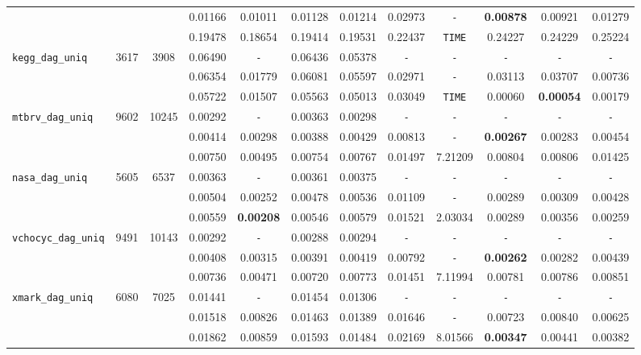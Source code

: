 \begin{table}
{\begin{tabular}{ l c c | c c c c c c c c c }
 &  &  & 0.01166 & 0.01011 & 0.01128 & 0.01214 & 0.02973 & \verb|-| & \textbf{0.00878} & 0.00921 & 0.01279 \\
 &  &  & 0.19478 & 0.18654 & 0.19414 & 0.19531 & 0.22437 & \verb|TIME| & 0.24227 & 0.24229 & 0.25224 \\
\hline
\verb|kegg_dag_uniq| & 3617 & 3908 & 0.06490 & \verb|-| & 0.06436 & 0.05378 & \verb|-| & \verb|-| & \verb|-| & \verb|-| & \verb|-| \\
 &  &  & 0.06354 & 0.01779 & 0.06081 & 0.05597 & 0.02971 & \verb|-| & 0.03113 & 0.03707 & 0.00736 \\
 &  &  & 0.05722 & 0.01507 & 0.05563 & 0.05013 & 0.03049 & \verb|TIME| & 0.00060 & \textbf{0.00054} & 0.00179 \\
\hline
\verb|mtbrv_dag_uniq| & 9602 & 10245 & 0.00292 & \verb|-| & 0.00363 & 0.00298 & \verb|-| & \verb|-| & \verb|-| & \verb|-| & \verb|-| \\
 &  &  & 0.00414 & 0.00298 & 0.00388 & 0.00429 & 0.00813 & \verb|-| & \textbf{0.00267} & 0.00283 & 0.00454 \\
 &  &  & 0.00750 & 0.00495 & 0.00754 & 0.00767 & 0.01497 & 7.21209 & 0.00804 & 0.00806 & 0.01425 \\
\hline
\verb|nasa_dag_uniq| & 5605 & 6537 & 0.00363 & \verb|-| & 0.00361 & 0.00375 & \verb|-| & \verb|-| & \verb|-| & \verb|-| & \verb|-| \\
 &  &  & 0.00504 & 0.00252 & 0.00478 & 0.00536 & 0.01109 & \verb|-| & 0.00289 & 0.00309 & 0.00428 \\
 &  &  & 0.00559 & \textbf{0.00208} & 0.00546 & 0.00579 & 0.01521 & 2.03034 & 0.00289 & 0.00356 & 0.00259 \\
\hline
\verb|vchocyc_dag_uniq| & 9491 & 10143 & 0.00292 & \verb|-| & 0.00288 & 0.00294 & \verb|-| & \verb|-| & \verb|-| & \verb|-| & \verb|-| \\
 &  &  & 0.00408 & 0.00315 & 0.00391 & 0.00419 & 0.00792 & \verb|-| & \textbf{0.00262} & 0.00282 & 0.00439 \\
 &  &  & 0.00736 & 0.00471 & 0.00720 & 0.00773 & 0.01451 & 7.11994 & 0.00781 & 0.00786 & 0.00851 \\
\hline
\verb|xmark_dag_uniq| & 6080 & 7025 & 0.01441 & \verb|-| & 0.01454 & 0.01306 & \verb|-| & \verb|-| & \verb|-| & \verb|-| & \verb|-| \\
 &  &  & 0.01518 & 0.00826 & 0.01463 & 0.01389 & 0.01646 & \verb|-| & 0.00723 & 0.00840 & 0.00625 \\
 &  &  & 0.01862 & 0.00859 & 0.01593 & 0.01484 & 0.02169 & 8.01566 & \textbf{0.00347} & 0.00441 & 0.00382 \\

\end{tabular}}
\end{table}
